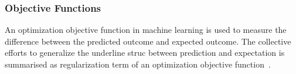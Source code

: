 \subsubsection{Objective Functions}
An optimization objective function in machine learning is used to measure the difference between the predicted outcome and expected outcome. The collective efforts to generalize the underline struc between prediction and expectation is summarised as regularization term of an optimization objective function~\cite{goodfellow_2015}.  